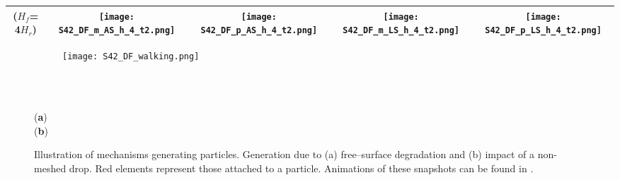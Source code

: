 \documentclass[final,3p,times]{elsarticle}
\newcommand{\EF}[1]{{\color{black}{#1}}}
\begin{document}
\begin{table}[t!]
\begin{tabular}{c cc cc}
\begin{minipage}{1.6cm}
  	  ($H_f$= 4$H_r$)
  	  \end{minipage}
  	  &
	  \texttt{[image: S42\_DF\_m\_AS\_h\_4\_t2.png]}
	  &\hspace{-4mm}
	  \texttt{[image: S42\_DF\_p\_AS\_h\_4\_t2.png]}
	  &
	  \texttt{[image: S42\_DF\_m\_LS\_h\_4\_t2.png]}
	  &\hspace{-4mm}
	  \texttt{[image: S42\_DF\_p\_LS\_h\_4\_t2.png]}
	  \vspace{-0mm}\\
	  \bottomrule
  \end{tabular}
\end{table}





\begin{figure}[t!]
\captionsetup[subfigure]{labelformat=empty}
	\begin{subfigure}[b]{1.0\textwidth}
		\texttt{[image: S42\_DF\_walking.png]}
		\caption{}
		\label{Fig:drop_walking_a}
	\end{subfigure}
	~
	\begin{subfigure}[b]{0.0\textwidth}\caption{}
		\label{Fig:drop_walking_b}
	\end{subfigure}
	\vspace{-53mm}\\
	\hspace{0mm} \footnotesize{}  (\textbf{a})
	\vspace{20mm}\\
	\hspace*{30mm} (\textbf{b}) 
	\vspace{14mm}\\
\caption{Illustration of mechanisms generating \EF{surfing} particles. Generation due to (a) free--surface degradation and (b) impact of a non-meshed drop. Red elements represent those attached to a \EF{surfing} particle. Animations of these snapshots can be found in \citep{YoutubeAll}.}  
\label{Fig:drop_walking}
\end{figure}
\end{document}
